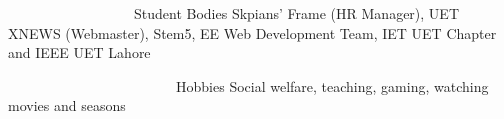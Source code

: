 \begin{cvskills}
	\cvskill
	{~~~~~~~~~~~~~~~~~~Student Bodies}
	{Skpians' Frame (HR Manager), UET XNEWS (Webmaster), Stem5, EE Web Development Team, IET UET Chapter and IEEE UET Lahore}
	
%	
	\cvskill
	{~~~~~~~~~~~~~~~~~~~~~~~~Hobbies}
	{Social welfare, teaching, gaming, watching movies and seasons}
\end{cvskills}
